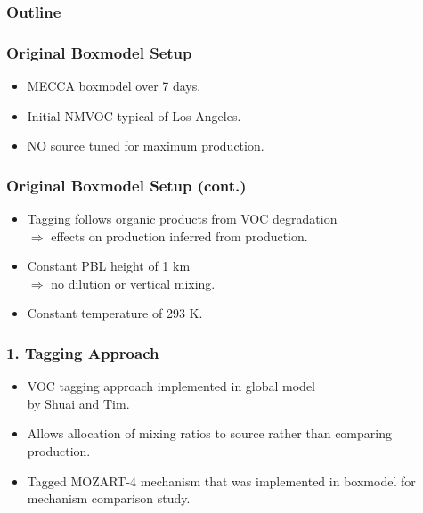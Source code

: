 \begin{frame}
    \frametitle{Outline} 
    \tableofcontents[currentsection]
\end{frame} 

\begin{frame}
    \frametitle{Original Boxmodel Setup}

    \vspace{-0.5cm}
    \begin{itemize}
        \item MECCA boxmodel over 7 days. \vspace{6mm}
        \item Initial NMVOC typical of Los Angeles. \vspace{6mm}
        \item NO source tuned for maximum  production. 
    \end{itemize}
\end{frame}

\begin{frame}
    \frametitle{Original Boxmodel Setup (cont.)}

    \vspace{-5mm}
    \begin{itemize}
        \item Tagging follows organic products from VOC degradation \\ \hspace{2mm}$\Rightarrow$ effects on  production inferred from  production. \vspace{4mm}
        \item Constant PBL height of 1 km \\ \hspace{2mm}$\Rightarrow$ no dilution or vertical mixing. \vspace{4mm}
        \item Constant temperature of 293 K.
    \end{itemize}
\end{frame}

\begin{frame}
    \frametitle{1. Tagging Approach}

    \vspace{-5mm}
    \begin{itemize}
        \item VOC tagging approach implemented in global model \\ by Shuai and Tim. \vspace{3mm}
        \item Allows allocation of  mixing ratios to source rather than comparing  production. \vspace{3mm}
        \item Tagged MOZART-4 mechanism that was implemented in boxmodel for mechanism comparison study.
    \end{itemize}
\end{frame}

